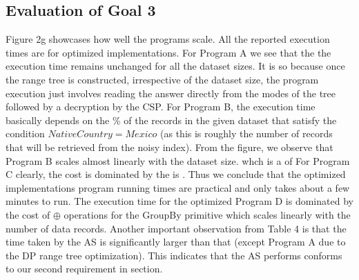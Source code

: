  \subsection{Evaluation of Goal 3}
 Figure 2g showcases how well the \system programs scale. All the reported execution times are for optimized implementations. For Program A we see that the the execution time remains unchanged for all the dataset sizes. It is so because once the range tree is constructed, irrespective of the dataset size, the program execution just involves reading the answer directly from the modes of the tree followed by a decryption by the \textsf{CSP}. For Program B, the execution time basically depends on the \% of the records in the given dataset that satisfy the condition $NativeCountry=Mexico$ (as this is roughly the number of records that will be retrieved from the noisy index). From the figure, we observe that Program B scales almost linearly with the dataset size. whch is a of 
 For Program C clearly, the cost is dominated by the  is . Thus we conclude that the optimized implementations \system program running times are practical and only takes about a few minutes to run. The execution time for the optimized Program D is dominated by the cost of $\oplus$ operations for the \textsf{GroupBy} primitive which scales linearly with the number of data records. Another important observation from Table 4 is that the time taken by the \textsf{AS} is significantly larger than that  (except Program A due to the DP range tree optimization). This indicates that the \textsf{AS} performs conforms to our second requirement in section. 
